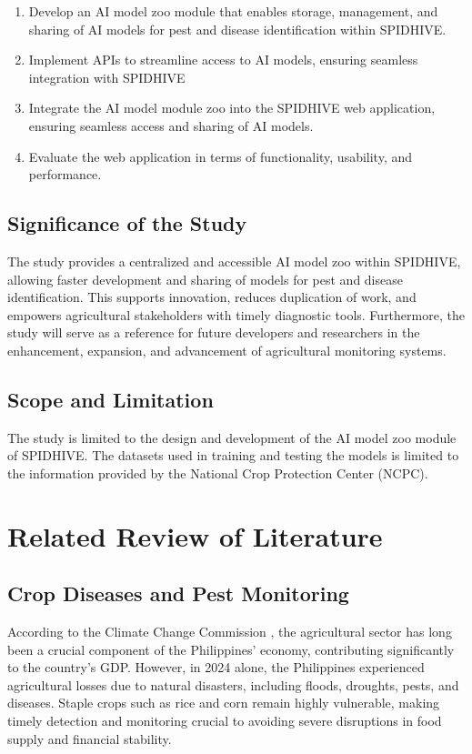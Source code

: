 \documentclass[journal]{./IEEE/IEEEtran}
\begin{document}
\begin{enumerate}
    \item Develop an AI model zoo module that enables storage, management, and sharing of AI models for pest and disease identification within SPIDHIVE.
    \item Implement APIs to streamline access to AI models, ensuring seamless integration with SPIDHIVE
    \item Integrate the AI model module zoo into the SPIDHIVE web application, ensuring seamless access and sharing of AI models.
    \item Evaluate the web application in terms of functionality, usability, and performance.
\end{enumerate}

\subsection{Significance of the Study}
The study provides a centralized and accessible AI model zoo within SPIDHIVE, allowing faster development and sharing of models for pest and disease identification. This supports innovation, reduces duplication of work, and empowers agricultural stakeholders with timely diagnostic tools. Furthermore, the study will serve as a reference for future developers and researchers in the enhancement, expansion, and advancement of agricultural monitoring systems. 

\subsection{Scope and Limitation}
The study is limited to the design and development of the AI model zoo module of SPIDHIVE. The datasets used in training and testing the models is limited to the information provided by the National Crop Protection Center (NCPC). 

\section{Related Review of Literature}
\subsection{Crop Diseases and Pest Monitoring}
According to the Climate Change Commission \cite{climate-change-commission-2017}, the agricultural sector has long been a crucial component of the Philippines' economy, contributing significantly to the country's GDP. However, in 2024 alone, the Philippines experienced agricultural losses due to natural disasters, including floods, droughts, pests, and diseases\cite{international-rice-research-institute-2025}. Staple crops such as rice and corn remain highly vulnerable, making timely detection and monitoring crucial to avoiding severe disruptions in food supply and financial stability.
\end{document}
